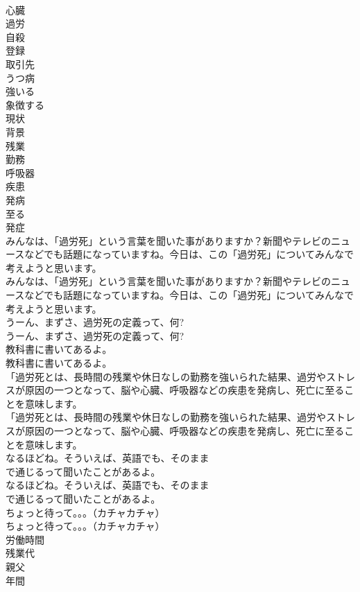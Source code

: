 \documentclass[8pt]{extreport}
\begin{document}
\begin{CJK}{UTF8}{min}
\\	心臓
\\	過労
\\	自殺
\\	登録
\\	取引先
\\	うつ病
\\	強いる
\\	象徴する
\\	現状
\\	背景
\\	残業
\\	勤務
\\	呼吸器
\\	疾患
\\	発病
\\	至る
\\	発症
\\	みんなは、「過労死」という言葉を聞いた事がありますか？新聞やテレビのニュースなどでも話題になっていますね。今日は、この「過労死」についてみんなで考えようと思います。	
\\	みんなは、「過労死」という言葉を聞いた事がありますか？新聞やテレビのニュースなどでも話題になっていますね。今日は、この「過労死」についてみんなで考えようと思います。 
\\	うーん、まずさ、過労死の定義って、何?	
\\	うーん、まずさ、過労死の定義って、何? 
\\	教科書に書いてあるよ。	
\\	教科書に書いてあるよ。 
\\	「過労死とは、長時間の残業や休日なしの勤務を強いられた結果、過労やストレスが原因の一つとなって、脳や心臓、呼吸器などの疾患を発病し、死亡に至ることを意味します。	
\\	「過労死とは、長時間の残業や休日なしの勤務を強いられた結果、過労やストレスが原因の一つとなって、脳や心臓、呼吸器などの疾患を発病し、死亡に至ることを意味します。 
\\	なるほどね。そういえば、英語でも、そのまま 
\\	で通じるって聞いたことがあるよ。	
\\	なるほどね。そういえば、英語でも、そのまま 
\\	で通じるって聞いたことがあるよ。 
\\	ちょっと待って。。。（カチャカチャ）	
\\	ちょっと待って。。。（カチャカチャ） 
\\	労働時間
\\	残業代
\\	親父
\\	年間

\end{CJK}
\end{document}
